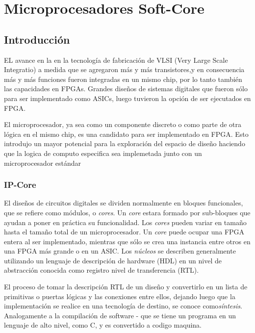 \section{Microprocesadores Soft-Core}

 \subsection{Introducción}

EL avance en la en la tecnología de fabricación de VLSI (Very Large Scale Integratio) a medida que se agregaron más y más transistores,y en consecuencia más y más funciones fueron integradas en un mismo chip, por lo tanto también las capacidades en FPGAs. Grandes diseños de sistemas digitales que fueron sólo para ser implementado como ASICs, luego tuvieron la opción de ser ejecutados en FPGA.

El microprocesador, ya sea como un componente discreto o  como parte de otra lógica en el mismo chip, es una candidato  para ser  implementado en FPGA. Esto introdujo un mayor potencial para la exploración del espacio de diseño haciendo que la logica de computo especifica sea implemetada junto con un microprocesador estándar %
		
		\subsubsection{ IP-Core}

El diseños de circuitos digitales se dividen normalmente en bloques funcionales, que se refiere como módulos, o \textit{cores}. Un \textit{core} estara formado por sub-bloques que ayudan a poner en práctica su funcionalidad. Los \textit{cores} pueden variar en tamaño hasta el tamaño total de un microprocesador. Un \textit{core} puede ocupar una FPGA entera al ser implementado, mientras que sólo se crea una instancia entre otros en una FPGA más grande o en un ASIC. Los \textit{núcleos} se describen generalmente utilizando un lenguaje de descripción de hardware (HDL) en un nivel de abstracción conocida como registro nivel de transferencia (RTL).

El proceso de tomar la descripción RTL de un diseño y convertirlo en un lista de primitivas o puertas lógicas y las conexiones entre ellos, dejando luego que la  implementación se realice en una tecnología de destino, se conoce como\textit{síntesis}. Analogamente a la compilación de software - que se tiene un programa en un lenguaje de alto nivel, como C, y  es convertido a codigo maquina. 

